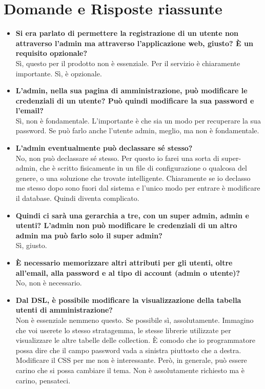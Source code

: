 \section{Domande e Risposte riassunte}
	\begin{itemize} 
		\item
		{\bfseries Si era parlato di permettere la registrazione di un utente non attraverso l'admin ma attraverso l'applicazione web, giusto? È un requisito opzionale?} \\
		Sì, questo per il prodotto non è essenziale. Per il servizio è chiaramente importante. Sì, è opzionale.
		
		\item
		{\bfseries L'admin, nella sua pagina di amministrazione, può modificare le credenziali di un utente? Può quindi modificare la sua password e l'email?} \\
		Sì, non è fondamentale. L'importante è che sia un modo per recuperare la sua password. Se può farlo anche l'utente admin, meglio, ma non è fondamentale.
		
		\item
		{\bfseries L'admin eventualmente può declassare sé stesso?} \\
		No, non può declassare sé stesso. Per questo io farei una sorta di super-admin, che è scritto fisicamente in un file di configurazione o qualcosa del genere, o una soluzione che trovate intelligente. Chiaramente se io declasso me stesso dopo sono fuori dal sistema e l'unico modo per entrare è modificare il database. Quindi diventa complicato.
		
		\item
		{\bfseries Quindi ci sarà una gerarchia a tre, con un super admin, admin e utenti? L'admin non può modificare le credenziali di un altro admin ma può farlo solo il super admin?} \\
		Sì, giusto.
		
		\item
		{\bfseries È necessario memorizzare altri attributi per gli utenti, oltre all'email, alla password e al tipo di account (admin o utente)?} \\
		No, non è necessario.
		
		\item
		{\bfseries Dal DSL, è possibile modificare la visualizzazione della tabella utenti di amministrazione?} \\
		Non è essenziale nemmeno questo. Se possibile sì, assolutamente. Immagino che voi userete lo stesso stratagemma, le stesse librerie utilizzate per visualizzare le altre tabelle delle collection.
		È comodo che io programmatore possa dire che il campo password vada a sinistra piuttosto che a destra. Modificare il CSS per me non è interessante. Però, in generale, può essere carino che si possa cambiare il tema. Non è assolutamente richiesto ma è carino, pensateci.
		

\end{itemize}
